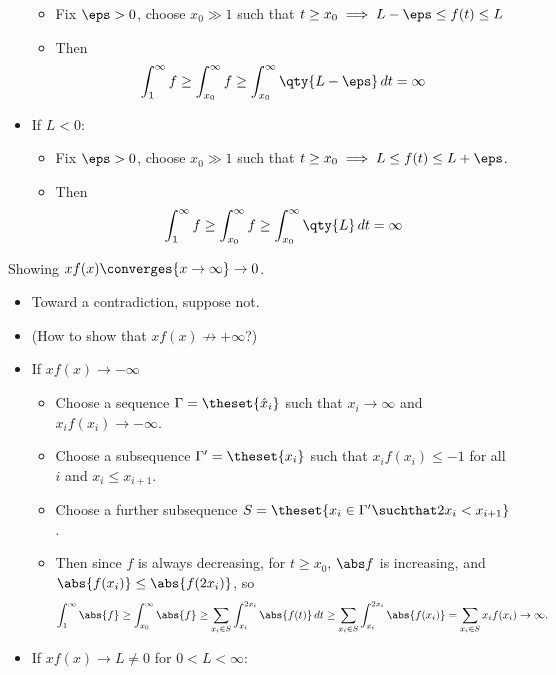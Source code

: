 \begin{solution}
\begin{itemize}
  \begin{itemize}
  \tightlist
  \item
    Fix \(\eps>0\), choose \(x_0\gg 1\) such that
    \(t\geq x_0 \implies L-\eps \leq f(t) \leq L\)
  \item
    Then
    \begin{align*}\int_1^\infty f \geq \int_{x_0}^\infty f \geq \int_{x_0}^\infty \qty{L-\eps}\,dt = \infty\end{align*}
  \end{itemize}
\item
  If \(L<0\):

  \begin{itemize}
  \tightlist
  \item
    Fix \(\eps > 0\), choose \(x_0\gg 1\) such that
    \(t\geq x_0 \implies L \leq f(t) \leq L + \eps\).
  \item
    Then
    \begin{align*}\int_1^\infty f \geq \int_{x_0}^\infty f \geq \int_{x_0}^\infty \qty{L}\,dt = \infty\end{align*}
  \end{itemize}
\end{itemize}

Showing \(xf(x) \converges{x\to \infty}\to 0\).

\begin{itemize}
\tightlist
\item
  Toward a contradiction, suppose not.
\item
  (How to show that \(xf(x) \not\to + \infty\)?)
\item
  If \(xf(x)\to -\infty\)

  \begin{itemize}
  \tightlist
  \item
    Choose a sequence \(\Gamma = \theset{\hat x_i}\) such that
    \(x_i \to \infty\) and \(x_i f(x_i) \to -\infty\).
  \item
    Choose a subsequence \(\Gamma' = \theset{x_i}\) such that
    \(x_if(x_i) \leq -1\) for all \(i\) and \(x_i \leq x_{i+1}\).
  \item
    Choose a further subsequence
    \(S = \theset{x_i \in \Gamma' \suchthat 2x_i < x_{i+1}}\).
  \item
    Then since \(f\) is always decreasing, for \(t\geq x_0\), \(\abs f\)
    is increasing, and \(\abs{f(x_i)} \leq \abs{f(2x_i)}\), so
    \begin{align*}
    \int_1^{\infty} \abs{f} \geq \int_{x_0}^\infty \abs{f} \geq \sum_{x_i \in S} \int_{x_i}^{2x_i} \abs{f(t)} \, dt \geq 
    \sum_{x_i \in S} \int_{x_i}^{2x_i} \abs{f(x_i)} &= \sum_{x_i \in S} x_i f(x_i) \to \infty
    .\end{align*}
  \end{itemize}
\item
  If \(xf(x) \to L \neq 0\) for \(0 < L< \infty\):


\end{itemize}
\end{solution}
